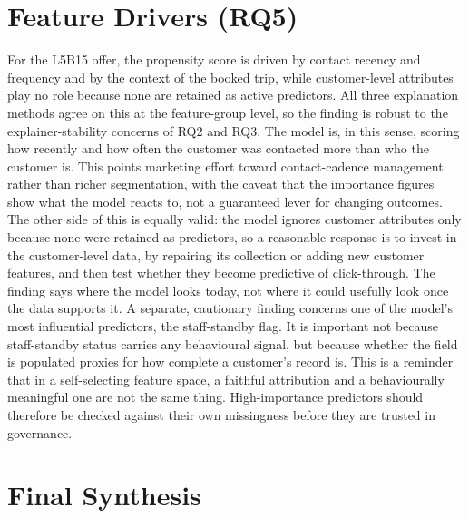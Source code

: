 \documentclass[oneside]{memoir} %
\begin{document}
\section{Feature Drivers (RQ5)}

For the L5B15 offer, the propensity score is driven by contact recency and frequency and by the context of the booked trip, while customer-level attributes play no role because none are retained as active predictors. All three explanation methods agree on this at the feature-group level, so the finding is robust to the explainer-stability concerns of RQ2 and RQ3. The model is, in this sense, scoring how recently and how often the customer was contacted more than who the customer is. This points marketing effort toward contact-cadence management rather than richer segmentation, with the caveat that the importance figures show what the model reacts to, not a guaranteed lever for changing outcomes. The other side of this is equally valid: the model ignores customer attributes only because none were retained as predictors, so a reasonable response is to invest in the customer-level data, by repairing its collection or adding new customer features, and then test whether they become predictive of click-through. The finding says where the model looks today, not where it could usefully look once the data supports it. A separate, cautionary finding concerns one of the model's most influential predictors, the staff-standby flag. It is important not because staff-standby status carries any behavioural signal, but because whether the field is populated proxies for how complete a customer's record is. This is a reminder that in a self-selecting feature space, a faithful attribution and a behaviourally meaningful one are not the same thing. High-importance predictors should therefore be checked against their own missingness before they are trusted in governance.

\section{Final Synthesis}
\end{document}
